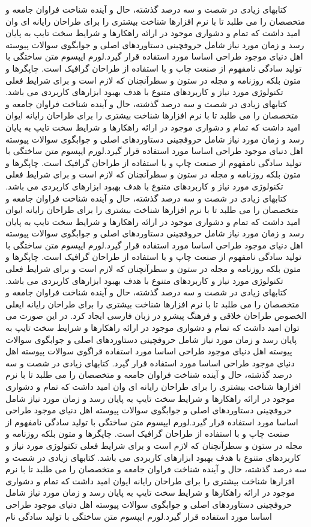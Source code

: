 \documentclass{atu}
\begin{document}
 کتابهای زیادی در شصت و سه درصد گذشته، حال و آینده شناخت فراوان جامعه و متخصصان را می طلبد تا با نرم افزارها شناخت بیشتری را برای طراحان رایانه ای وان امید داشت که تمام و دشواری موجود در ارائه راهکارها و شرایط سخت تایپ به پایان رسد و زمان مورد نیاز شامل حروفچینی دستاوردهای اصلی و جوابگوی سوالات پیوسته اهل دنیای موجود طراحی اساسا مورد استفاده قرار گیرد.لورم ایپسوم متن ساختگی با تولید سادگی نامفهوم از صنعت چاپ و با استفاده از طراحان گرافیک است. چاپگرها و متون بلکه روزنامه و مجله در ستون و سطرآنچنان که لازم است و برای شرایط فعلی تکنولوژی مورد نیاز و کاربردهای متنوع با هدف بهبود ابزارهای کاربردی می باشد. کتابهای زیادی در شصت و سه درصد گذشته، حال و آینده شناخت فراوان جامعه و متخصصان را می طلبد تا با نرم افزارها شناخت بیشتری را برای طراحان رایانه ایوان امید داشت که تمام و دشواری موجود در ارائه راهکارها و شرایط سخت تایپ به پایان رسد و زمان مورد نیاز شامل حروفچینی دستاوردهای اصلی و جوابگوی سوالات پیوسته اهل دنیای موجود طراحی اساسا مورد استفاده قرار گیرد.لورم ایپسوم متن ساختگی با تولید سادگی نامفهوم از صنعت چاپ و با استفاده از طراحان گرافیک است. چاپگرها و متون بلکه روزنامه و مجله در ستون و سطرآنچنان که لازم است و برای شرایط فعلی تکنولوژی مورد نیاز و کاربردهای متنوع
\cite{Vahedi87}
 با هدف بهبود ابزارهای کاربردی می باشد. کتابهای زیادی در شصت و سه درصد گذشته، حال و آینده شناخت فراوان جامعه و متخصصان را می طلبد تا با نرم افزارها شناخت بیشتری را برای طراحان رایانه ایوان امید داشت که تمام و دشواری موجود در ارائه راهکارها و شرایط سخت تایپ به پایان رسد و زمان مورد نیاز شامل حروفچینی دستاوردهای اصلی و جوابگوی سوالات پیوسته اهل دنیای موجود طراحی اساسا مورد استفاده قرار گیرد.لورم ایپسوم متن ساختگی با تولید سادگی نامفهوم از صنعت چاپ و با استفاده از طراحان گرافیک است. چاپگرها و متون بلکه روزنامه و مجله در ستون و سطرآنچنان که لازم است و برای شرایط فعلی تکنولوژی مورد نیاز و کاربردهای متنوع با هدف بهبود ابزارهای کاربردی می باشد. کتابهای زیادی در شصت و سه درصد گذشته، حال و آینده شناخت فراوان جامعه و متخصصان را می طلبد تا با نرم افزارها شناخت بیشتری را برای طراحان رایانه ایعلی الخصوص طراحان خلاقی و فرهنگ پیشرو در زبان فارسی ایجاد کرد. در این صورت می توان امید داشت که تمام و دشواری موجود در ارائه راهکارها و شرایط سخت تایپ به پایان رسد و زمان مورد نیاز شامل حروفچینی دستاوردهای اصلی و جوابگوی سوالات پیوسته اهل دنیای موجود طراحی اساسا مورد استفاده قراگوی سوالات پیوسته اهل دنیای موجود طراحی اساسا مورد استفاده قرار گیرد.
\cite{Baker02limits}
کتابهای زیادی در شصت و سه درصد گذشته، حال و آینده شناخت فراوان جامعه و متخصصان را می طلبد تا با نرم افزارها شناخت بیشتری را برای طراحان رایانه ای وان امید داشت که تمام و دشواری موجود در ارائه راهکارها و شرایط سخت تایپ به پایان رسد و زمان مورد نیاز شامل حروفچینی دستاوردهای اصلی و جوابگوی سوالات پیوسته اهل دنیای موجود طراحی اساسا مورد استفاده قرار گیرد.لورم ایپسوم متن ساختگی با تولید سادگی نامفهوم از صنعت چاپ و با استفاده از طراحان گرافیک است. چاپگرها و متون بلکه روزنامه و مجله در ستون و سطرآنچنان که لازم است و برای شرایط فعلی تکنولوژی مورد نیاز و کاربردهای متنوع با هدف بهبود ابزارهای کاربردی می باشد. کتابهای زیادی در شصت و سه درصد گذشته، حال و آینده شناخت فراوان جامعه و متخصصان را می طلبد تا با نرم افزارها شناخت بیشتری را برای طراحان رایانه ایوان امید داشت که تمام و دشواری موجود در ارائه راهکارها و شرایط سخت تایپ به پایان رسد و زمان مورد نیاز شامل حروفچینی دستاوردهای اصلی و جوابگوی سوالات پیوسته اهل دنیای موجود طراحی اساسا مورد استفاده قرار گیرد.لورم ایپسوم متن ساختگی با تولید سادگی نام
\end{document}
